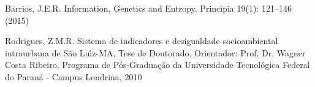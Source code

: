\documentclass[
12pt,		%
openright,	%
twoside,  %
a4paper,			%
chapter=TITLE,		%
english,			%
french,				%
spanish,			%
brazil				%
]{USPSC-classe/USPSC_RedarTex}
\begin{document}
\begin{flushleft}
\begin{flushleft}
\begin{flushleft}
\begin{flushleft}
\begin{flushleft}
\begin{flushleft}
\begin{flushleft}
\begin{flushleft}
[Barrios, 2015] Barrios, J.E.R. Information, Genetics and Entropy, Principia 19(1): 121–146 (2015)
\end{flushleft}


\end{flushleft}


\end{flushleft}


\end{flushleft}


\end{flushleft}


\end{flushleft}


\end{flushleft}


\end{flushleft}


\begin{flushleft}
\begin{flushleft}
\begin{flushleft}
\begin{flushleft}
\begin{flushleft}
\begin{flushleft}
\begin{flushleft}
\begin{flushleft}
[Rodrigues, 2010] Rodrigues, Z.M.R. Sistema de indicadores e desigualdade socioambiental intraurbana de S\~ao Lu\'{\i}z-MA, Tese de Doutorado, Orientador: Prof. Dr. Wagner Costa Ribeiro, Programa de P\'os-Gradua\c{c}\~ao da Universidade Tecnol\'ogica Federal do Paran\'a - Campus Londrina, 2010
\end{flushleft}


\end{flushleft}


\end{flushleft}


\end{flushleft}


\end{flushleft}


\end{flushleft}


\end{flushleft}


\end{flushleft}
\end{document}
